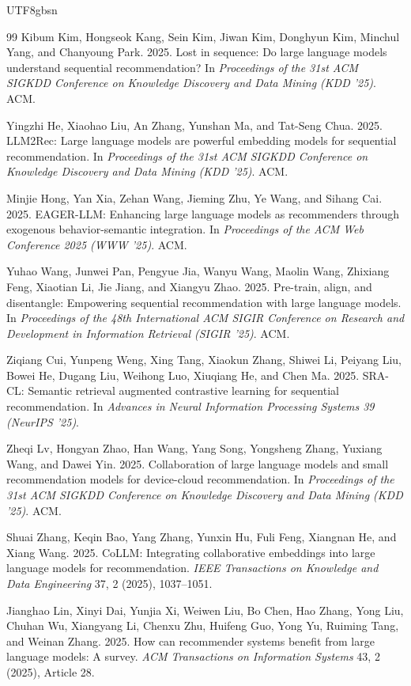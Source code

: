 \documentclass{article}
\begin{document}
\begin{CJK*}{UTF8}{gbsn}
\begin{thebibliography}{99}
Kibum Kim, Hongseok Kang, Sein Kim, Jiwan Kim, Donghyun Kim, Minchul Yang, and Chanyoung Park. 2025.
Lost in sequence: Do large language models understand sequential recommendation?
In \textit{Proceedings of the 31st ACM SIGKDD Conference on Knowledge Discovery and Data Mining (KDD '25)}. ACM.

Yingzhi He, Xiaohao Liu, An Zhang, Yunshan Ma, and Tat-Seng Chua. 2025.
LLM2Rec: Large language models are powerful embedding models for sequential recommendation.
In \textit{Proceedings of the 31st ACM SIGKDD Conference on Knowledge Discovery and Data Mining (KDD '25)}. ACM.

Minjie Hong, Yan Xia, Zehan Wang, Jieming Zhu, Ye Wang, and Sihang Cai. 2025.
EAGER-LLM: Enhancing large language models as recommenders through exogenous behavior-semantic integration.
In \textit{Proceedings of the ACM Web Conference 2025 (WWW '25)}. ACM.

Yuhao Wang, Junwei Pan, Pengyue Jia, Wanyu Wang, Maolin Wang, Zhixiang Feng, Xiaotian Li, Jie Jiang, and Xiangyu Zhao. 2025.
Pre-train, align, and disentangle: Empowering sequential recommendation with large language models.
In \textit{Proceedings of the 48th International ACM SIGIR Conference on Research and Development in Information Retrieval (SIGIR '25)}. ACM.

Ziqiang Cui, Yunpeng Weng, Xing Tang, Xiaokun Zhang, Shiwei Li, Peiyang Liu, Bowei He, Dugang Liu, Weihong Luo, Xiuqiang He, and Chen Ma. 2025.
SRA-CL: Semantic retrieval augmented contrastive learning for sequential recommendation.
In \textit{Advances in Neural Information Processing Systems 39 (NeurIPS '25)}.

Zheqi Lv, Hongyan Zhao, Han Wang, Yang Song, Yongsheng Zhang, Yuxiang Wang, and Dawei Yin. 2025.
Collaboration of large language models and small recommendation models for device-cloud recommendation.
In \textit{Proceedings of the 31st ACM SIGKDD Conference on Knowledge Discovery and Data Mining (KDD '25)}. ACM.

Shuai Zhang, Keqin Bao, Yang Zhang, Yunxin Hu, Fuli Feng, Xiangnan He, and Xiang Wang. 2025.
CoLLM: Integrating collaborative embeddings into large language models for recommendation.
\textit{IEEE Transactions on Knowledge and Data Engineering} 37, 2 (2025), 1037--1051.

Jianghao Lin, Xinyi Dai, Yunjia Xi, Weiwen Liu, Bo Chen, Hao Zhang, Yong Liu, Chuhan Wu, Xiangyang Li, Chenxu Zhu, Huifeng Guo, Yong Yu, Ruiming Tang, and Weinan Zhang. 2025.
How can recommender systems benefit from large language models: A survey.
\textit{ACM Transactions on Information Systems} 43, 2 (2025), Article 28.


\end{thebibliography}
\end{CJK*}
\end{document}
